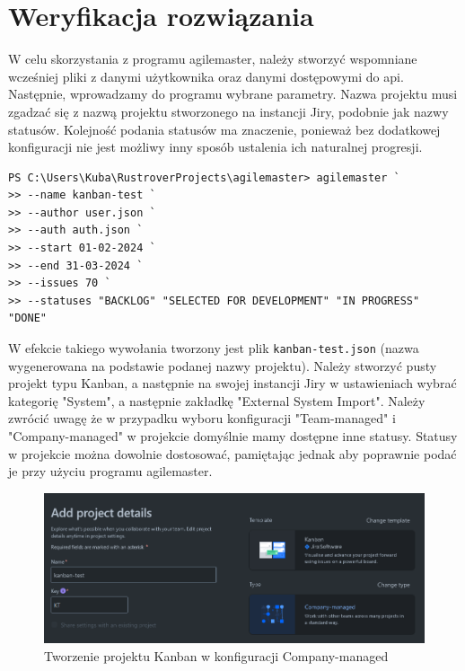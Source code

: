 \section{Weryfikacja rozwiązania}
W celu skorzystania z programu agilemaster, należy stworzyć wspomniane wcześniej pliki z danymi użytkownika oraz danymi dostępowymi do api.
Następnie, wprowadzamy do programu wybrane parametry. Nazwa projektu musi zgadzać się z nazwą projektu stworzonego na instancji Jiry, podobnie jak nazwy statusów.
Kolejność podania statusów ma znaczenie, ponieważ bez dodatkowej konfiguracji nie jest możliwy inny sposób ustalenia ich naturalnej progresji.
\begin{lstlisting}[caption=Przykładowe użycie programu agilemaster]
PS C:\Users\Kuba\RustroverProjects\agilemaster> agilemaster `
>> --name kanban-test `
>> --author user.json `
>> --auth auth.json `
>> --start 01-02-2024 `
>> --end 31-03-2024 `
>> --issues 70 `
>> --statuses "BACKLOG" "SELECTED FOR DEVELOPMENT" "IN PROGRESS" "DONE"
\end{lstlisting}

W efekcie takiego wywołania tworzony jest plik \texttt{kanban-test.json} (nazwa wygenerowana na podstawie podanej nazwy projektu).
Należy stworzyć pusty projekt typu Kanban, a następnie na swojej instancji Jiry w ustawieniach wybrać kategorię "System", a następnie zakładkę "External System Import".
Należy zwrócić uwagę że w przypadku wyboru konfiguracji "Team-managed" i "Company-managed" w projekcie domyślnie mamy dostępne inne statusy.
Statusy w projekcie można dowolnie dostosować, pamiętając jednak aby poprawnie podać je przy użyciu programu agilemaster.
\begin{figure}[H]
    \centering
    \includegraphics[width=12cm,keepaspectratio]{rysunki/tworzenie-projektu.png}
    \caption{Tworzenie projektu Kanban w konfiguracji Company-managed}
\end{figure}

